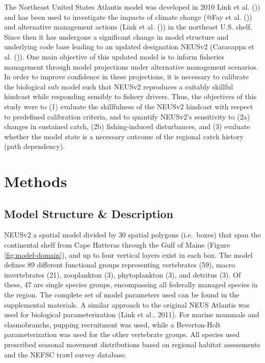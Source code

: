 \documentclass[
]{article}
\begin{document}
The Northeast United States Atlantis model was developed in 2010 Link et al. ()) and has been used to investigate the impacts of climate change (@Fay et al. ()) and alternative management actions (Link et al. ()) in the northeast U.S. shelf. Since then it has undergone a significant change in model structure and underlying code base leading to an updated designation NEUSv2 (Caracappa et al. ()). One main objective of this updated model is to inform fisheries management through model projections under alternative management scenarios. In order to improve confidence in these projections, it is necessary to calibrate the biological sub model such that NEUSv2 reproduces a suitably skillful hindcast while responding sensibly to fishery drivers. Thus, the objectives of this study were to (1) evaluate the skillfulness of the NEUSv2 hindcast with respect to predefined calibration criteria, and to quantify NEUSv2's sensitivity to (2a) changes in sustained catch, (2b) fishing-induced disturbances, and (3) evaluate whether the model state is a necessary outcome of the regional catch history (path dependency).

\section{Methods}\label{methods}

\subsection{Model Structure \& Description}\label{model-structure-description}

NEUSv2 a spatial model divided by 30 spatial polygons (i.e.~boxes) that span the continental shelf from Cape Hatteras through the Gulf of Maine (Figure \ref{fig:model-domain}), and up to four vertical layers exist in each box. The model defines 89 different functional groups representing vertebrates (59), macro invertebrates (21), zooplankton (3), phytoplankton (3), and detritus (3). Of these, 47 are single species groups, encompassing all federally managed species in the region. The complete set of model parameters used can be found in the supplemental materials. A similar approach to the original NEUS Atlantis was used for biological parameterization (Link et al., 2011). For marine mammals and elasmobranchs, pupping recruitment was used, while a Beverton-Holt parameterization was used for the other vertebrate groups. All species used prescribed seasonal movement distributions based on regional habitat assessments and the NEFSC trawl survey database.
\end{document}
